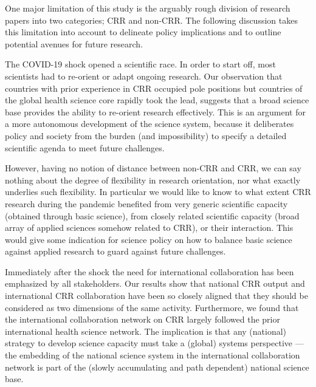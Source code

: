 One major limitation of this study is the arguably rough division of research papers into two categories; CRR and non-CRR. The following discussion takes this limitation into account to delineate policy implications and to outline potential avenues for future research. 

The COVID-19 shock opened a scientific race. In order to start off, most scientists had to re-orient or adapt ongoing research. Our observation that countries with prior experience in CRR occupied pole positions but countries of the global health science core rapidly took the lead, suggests that a broad science base provides the ability to re-orient research effectively. This is an argument for a more autonomous development of the science system, because it deliberates policy and society from the burden (and impossibility) to specify a detailed scientific agenda to meet future challenges. 

However, having no notion of distance between non-CRR and CRR, we can say nothing about the degree of flexibility in research orientation, nor what exactly underlies such flexibility. In particular we would like to know to what extent CRR research during the pandemic benefited from very generic scientific capacity (obtained through basic science), from closely related scientific capacity (broad array of applied sciences somehow related to CRR), or their interaction. This would give some indication for science policy on how to balance basic science against applied research to guard against future challenges. 

Immediately after the shock the need for international collaboration has been emphasized by all stakeholders. Our results show that national CRR output and international CRR collaboration have been so closely aligned that they should be considered as two dimensions of the same activity. Furthermore, we found that the international collaboration network on CRR largely followed the prior international health science network. The implication is that any (national) strategy to develop science capacity must take a (global) systems perspective --- the embedding of the national science system in the international collaboration network is part of the (slowly accumulating and path dependent) national science base. 

